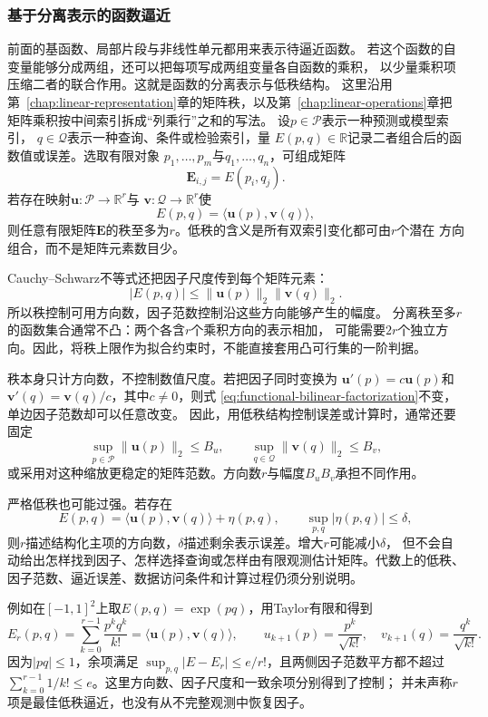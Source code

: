 \subsubsection{基于分离表示的函数逼近}
\label{sec:functional-separated-approximation}

前面的基函数、局部片段与非线性单元都用来表示待逼近函数。
若这个函数的自变量能够分成两组，还可以把每项写成两组变量各自函数的乘积，
以少量乘积项压缩二者的联合作用。这就是函数的分离表示与低秩结构。
这里沿用第~\ref{chap:linear-representation}章的矩阵秩，以及第~\ref{chap:linear-operations}章把矩阵乘积按中间索引拆成“列乘行”之和的写法。
设$p\in\mathcal{P}$表示一种预测或模型索引，
$q\in\mathcal{Q}$表示一种查询、条件或检验索引，量
$E(p,q)\in\mathbb{R}$记录二者组合后的函数值或误差。选取有限对象
$p_1,\ldots,p_m$与$q_1,\ldots,q_n$，可组成矩阵
\[
  \bm{E}_{i,j}=E(p_i,q_j).
\]
若存在映射$\bm{u}:\mathcal{P}\to\mathbb{R}^r$与
$\bm{v}:\mathcal{Q}\to\mathbb{R}^r$使
\begin{equation}
  E(p,q)
  =
  \langle\bm{u}(p),\bm{v}(q)\rangle,
  \label{eq:functional-bilinear-factorization}
\end{equation}
则任意有限矩阵$\bm{E}$的秩至多为$r$。低秩的含义是所有双索引变化都可由$r$个潜在
方向组合，而不是矩阵元素数目少。

Cauchy--Schwarz不等式还把因子尺度传到每个矩阵元素：
\[
  |E(p,q)|
  \leq
  \lVert\bm{u}(p)\rVert_2
  \lVert\bm{v}(q)\rVert_2.
\]
所以秩控制可用方向数，因子范数控制沿这些方向能够产生的幅度。
分离秩至多$r$的函数集合通常不凸：两个各含$r$个乘积方向的表示相加，
可能需要$2r$个独立方向。因此，将秩上限作为拟合约束时，不能直接套用凸可行集的一阶判据。

秩本身只计方向数，不控制数值尺度。若把因子同时变换为
$\bm{u}'(p)=c\bm{u}(p)$和
$\bm{v}'(q)=\bm{v}(q)/c$，其中$c\neq0$，则式
\eqref{eq:functional-bilinear-factorization}不变，单边因子范数却可以任意改变。
因此，用低秩结构控制误差或计算时，通常还要固定
\[
  \sup_{p\in\mathcal{P}}\lVert\bm{u}(p)\rVert_2\leq B_u,
  \qquad
  \sup_{q\in\mathcal{Q}}\lVert\bm{v}(q)\rVert_2\leq B_v,
\]
或采用对这种缩放更稳定的矩阵范数。方向数$r$与幅度$B_uB_v$承担不同作用。

严格低秩也可能过强。若存在
\[
  E(p,q)
  =
  \langle\bm{u}(p),\bm{v}(q)\rangle+\eta(p,q),
  \qquad
  \sup_{p,q}|\eta(p,q)|\leq\delta,
\]
则$r$描述结构化主项的方向数，$\delta$描述剩余表示误差。增大$r$可能减小$\delta$，
但不会自动给出怎样找到因子、怎样选择查询或怎样由有限观测估计矩阵。代数上的低秩、
因子范数、逼近误差、数据访问条件和计算过程仍须分别说明。

例如在$[-1,1]^2$上取$E(p,q)=\exp(pq)$，用Taylor有限和得到
\[
 E_r(p,q)=\sum_{k=0}^{r-1}\frac{p^kq^k}{k!}
 =\langle\bm u(p),\bm v(q)\rangle,\qquad
 u_{k+1}(p)=\frac{p^k}{\sqrt{k!}},\quad
 v_{k+1}(q)=\frac{q^k}{\sqrt{k!}}.
\]
因为$|pq|\leq1$，余项满足
$\sup_{p,q}|E-E_r|\leq e/r!$，且两侧因子范数平方都不超过
$\sum_{k=0}^{r-1}1/k!\leq e$。这里方向数、因子尺度和一致余项分别得到了控制；
并未声称$r$项是最佳低秩逼近，也没有从不完整观测中恢复因子。

